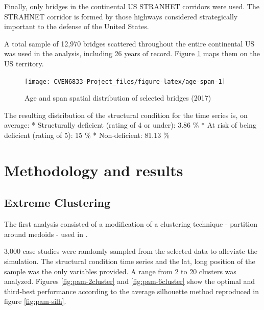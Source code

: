 \documentclass[]{book}
\theoremstyle{definition}
\theoremstyle{definition}
\theoremstyle{definition}
\theoremstyle{remark}
\begin{document}
Finally, only bridges in the continental US STRANHET corridors were
used. The STRAHNET corridor is formed by those highways considered
strategically important to the defense of the United States.

A total sample of 12,970 bridges scattered throughout the entire
continental US was used in the analysis, including 26 years of record.
Figure \ref{fig:age-span} maps them on the US territory.

\begin{figure}

{\centering \texttt{[image: CVEN6833-Project\_files/figure-latex/age-span-1]} 

}

\caption{Age and span spatial distribution of selected bridges (2017)}\label{fig:age-span}
\end{figure}

The resulting distribution of the structural condition for the time
series is, on average: * Structurally deficient (rating of 4 or under):
3.86 \% * At risk of being deficient (rating of 5): 15 \% *
Non-deficient: 81.13 \%

\chapter{Methodology and results}\label{methodology-and-results}

\section{Extreme Clustering}\label{extreme-clustering}

The first analysis consisted of a modification of a clustering technique
- partition around medoids - used in
\citet{brackenSpatialVariabilitySeasonal2015}.

3,000 case studies were randomly sampled from the selected data to
alleviate the simulation. The structural condition time series and the
lat, long position of the sample was the only variables provided. A
range from 2 to 20 clusters was analyzed. Figures \ref{fig:pam-2cluster}
and \ref{fig:pam-6cluster} show the optimal and third-best performance
according to the average silhouette method reproduced in figure
\ref{fig:pam-silh}.
\end{document}
